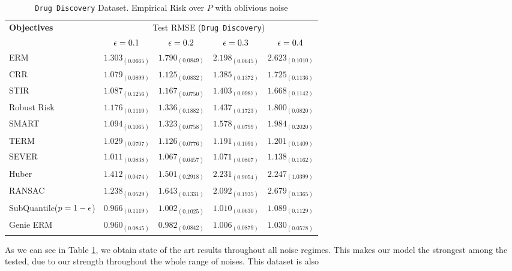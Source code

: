 \documentclass{article} %
\newcommand{\subhead}[1]{\multicolumn{1}{c}{#1}}%
\begin{document}
	\begin{table}[!h]
		\centering
		\begin{tabular}{lcccc}
			\toprule 
			\textbf{Objectives}&\multicolumn{4}{c}{Test RMSE (\texttt{Drug Discovery})}\\                   
			\cmidrule(rl){2-5}
			&\subhead{${\epsilon} = 0.1$}& \subhead{${\epsilon} = 0.2$}& \subhead{${\epsilon} = 0.3$}& \subhead{${\epsilon} = 0.4$}\\ 
			\midrule
			ERM  &$1.303_{(0.0665)}$&$1.790_{(0.0849)}$&$2.198_{(0.0645)}$&$2.623_{(0.1010)}$\\
			CRR \cite{bhatia2017}  &$1.079_{(0.0899)}$&$1.125_{(0.0832)}$&$1.385_{(0.1372)}$&$1.725_{(0.1136)}$\\
			STIR \cite{pmlr-v89-mukhoty19a} &$1.087_{(0.1256)}$&$1.167_{(0.0750)}$&$1.403_{(0.0987)}$&$1.668_{(0.1142)}$\\
			Robust Risk \cite{RRM} &$1.176_{(0.1110)}
			$&$1.336_{(0.1882)}$&$1.437_{(0.1723)}$&$1.800_{(0.0820)}$\\
			SMART \cite{https://doi.org/10.48550/arxiv.2206.04777} &$1.094_{(0.1065)}$&$1.323_{(0.0758)}$&$1.578_{(0.0799)}$&$1.984_{(0.2020)}$\\
			TERM \cite{li2020tilted} &$1.029_{(0.0707)}$&$1.126_{(0.0776)}$&$1.191_{(0.1091)}$&$1.201_{(0.1409)}$\\
			SEVER \cite{DiakonikolasKKLSS19} &$\mathbf{1.011_{(0.0838)}}$&$\mathbf{1.067_{(0.0457)}}$&$\mathbf{1.071_{(0.0807)}}$&$\mathbf{1.138_{(0.1162)}}$\\
			Huber \cite{Huber2009} &$1.412_{(0.0474)}$&$1.501_{(0.2918)}$&$2.231_{(0.9054)}$&$2.247_{(1.0399)}$\\
			RANSAC \cite{RANSAC1981} &$1.238_{(0.0529)}$&$1.643_{(0.1331)}$&$2.092_{(0.1935)}$&$2.679_{(0.1365)}$\\
			\rowcolor{LightCyan}
			SubQuantile($p = 1-{\epsilon}$) &$\mathbf{0.966_{(0.1119)}}$&$\mathbf{1.002_{(0.1025)}}$&$\mathbf{1.010_{(0.0630)}}$&$\mathbf{1.089_{(0.1129)}}$\\
			\midrule 
			Genie ERM &$0.960_{(0.0845)}$&$0.982_{(0.0842)}$&$1.006_{(0.0879)}$&$1.030_{(0.0578)}$\\
			\bottomrule
		\end{tabular}
		\caption{\texttt{Drug Discovery} Dataset. Empirical Risk over $P$ with oblivious noise}
		\label{tab:drug-discovery}
	\end{table}
	
	As we can see in Table \ref{tab:drug-discovery}, we obtain state of the art results throughout all noise regimes. This makes our model the strongest among the tested, due to our strength throughout the whole range of noises. This dataset is also 
	
\end{document}
